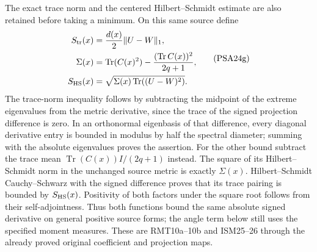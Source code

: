 The exact trace norm and the centered Hilbert--Schmidt estimate
are also retained before taking a minimum. On this same source define
\[
 \begin{aligned}
 S_{\rm tr}(x)&=\frac{d(x)}{2}\|U-W\|_1,\\
 \Sigma(x)&=\operatorname{Tr}(C(x)^2)
       -\frac{(\operatorname{Tr}C(x))^2}{2q+1},\\
 S_{\rm HS}(x)&=\sqrt{\Sigma(x)\operatorname{Tr}((U-W)^2)}.
 \end{aligned}
 \tag{PSA24g}
\]
The trace-norm inequality follows by subtracting the midpoint
of the extreme eigenvalues from the metric derivative, since the
trace of the signed projection difference is zero. In an orthonormal
eigenbasis of that difference, every diagonal derivative entry is
bounded in modulus by half the spectral diameter; summing with
the absolute eigenvalues proves the assertion.
For the other bound subtract the trace mean
$\operatorname{Tr}(C(x))I/(2q+1)$ instead.
The square of its Hilbert--Schmidt norm in the unchanged source
metric is exactly $\Sigma(x)$. Hilbert--Schmidt Cauchy--Schwarz
with the signed difference proves that its trace pairing is bounded
by $S_{\rm HS}(x)$. Positivity of both factors under the square
root follows from their self-adjointness. Thus both functions bound
the same absolute signed derivative on general positive source forms;
the angle term below still uses the specified moment measures.
These are RMT10a--10b and ISM25--26 through the already proved
original coefficient and projection maps.

